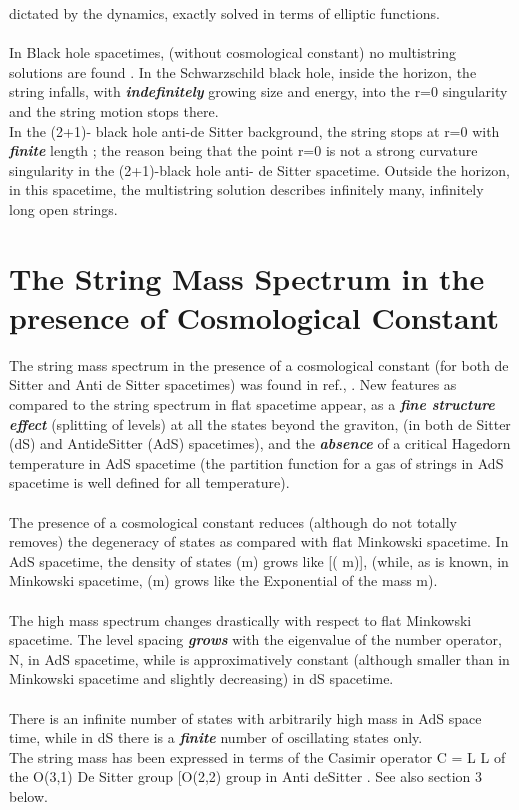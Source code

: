 \documentclass[12pt,a4paper]{article}
\begin{document}
dictated by the dynamics, exactly solved in terms of elliptic functions. \\ \\
In Black hole spacetimes, (without cosmological constant) no multistring 
solutions are found \cite{ls2}. In the Schwarzschild black hole, inside the 
horizon, 
the string infalls, with {\it \bf indefinitely} growing size and energy, into the r=0 singularity and the string motion stops there.\\ In the (2+1)- black hole anti-de Sitter background, the string stops at r=0 with {\it \bf  
finite} length \cite{ls3}; the reason being that the point r=0 is not a strong 
curvature singularity in the (2+1)-black hole anti- de Sitter spacetime. 
Outside the horizon, in this spacetime, the multistring solution describes 
infinitely many, infinitely long open strings. 
\section{The String Mass Spectrum in the presence of Cosmological Constant}
The string mass spectrum in the presence of a cosmological constant (for both 
de Sitter and Anti de Sitter spacetimes) was found in ref.\cite{ls3}, 
\cite{vls2}. 
New features as 
compared to the string spectrum in flat spacetime appear, as a {\it \bf 
fine structure effect} (splitting of levels) at all the states beyond the 
graviton, (in both de Sitter (dS) and AntideSitter (AdS) spacetimes), and the 
{\it \bf absence} of a critical Hagedorn temperature in AdS spacetime 
(the partition function for a gas of strings in AdS spacetime is well defined 
for all temperature).\\ \\ The presence of a cosmological constant reduces 
(although do not totally removes) the degeneracy of states as compared with 
flat Minkowski spacetime. In AdS spacetime, the density of states \myHighlight{$\rho$}\coordHE{}(m) 
grows like \myHighlight{$\exp$}\coordHE{}[(\myHighlight{$\Lambda$}\coordHE{} m)\coordHE{}], (while, as is known, in 
Minkowski spacetime, \myHighlight{$\rho$}\coordHE{}(m) grows like the Exponential of the mass m). \\ \\
The 
high mass spectrum changes drastically with respect to flat Minkowski spacetime. The level spacing {\it \bf 
grows} with the eigenvalue of the number operator, N, in AdS spacetime, while 
is approximatively constant (although smaller than in Minkowski spacetime and 
slightly decreasing) in dS spacetime. \\ \\ There is an infinite number of 
states 
with arbitrarily high mass in AdS space time, while in dS there is a 
{\it \bf finite} number of oscillating states only.\\The string mass has 
been expressed in terms of 
the Casimir operator C = L\myHighlight{$_{\mu\nu}$}\coordHE{} L\myHighlight{$^{\mu\nu}$}\coordHE{} of the O(3,1) De Sitter 
group [O(2,2) group in Anti deSitter \cite{vls2}. See also section 3 below.
\end{document}

